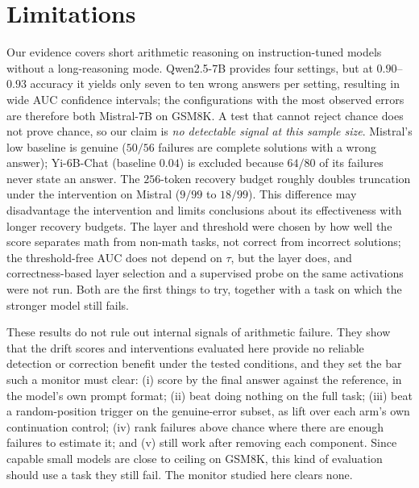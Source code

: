\documentclass{article}
\begin{document}
\section{Limitations}
\label{sec:limits}

Our evidence covers short arithmetic reasoning on instruction-tuned models without a long-reasoning mode. Qwen2.5-7B provides four settings, but at $0.90$--$0.93$ accuracy it yields only seven to ten wrong answers per setting, resulting in wide AUC confidence intervals; the configurations with the most observed errors are therefore both Mistral-7B on GSM8K. A test that cannot reject chance does not prove chance, so our claim is \emph{no detectable signal at this sample size}. Mistral's low baseline is genuine ($50/56$ failures are complete solutions with a wrong answer); Yi-6B-Chat (baseline $0.04$) is excluded because $64/80$ of its failures never state an answer. The $256$-token recovery budget roughly doubles truncation under the intervention on Mistral ($9/99$ to $18/99$). This difference may disadvantage the intervention and limits conclusions about its effectiveness with longer recovery budgets. The layer and threshold were chosen by how well the score separates math from non-math tasks, not correct from incorrect solutions; the threshold-free AUC does not depend on $\tau$, but the layer does, and correctness-based layer selection and a supervised probe on the same activations were not run. Both are the first things to try, together with a task on which the stronger model still fails.

These results do not rule out internal signals of arithmetic failure. They show that the drift scores and interventions evaluated here provide no reliable detection or correction benefit under the tested conditions, and they set the bar such a monitor must clear: (i) score by the final answer against the reference, in the model's own prompt format; (ii) beat doing nothing on the full task; (iii) beat a random-position trigger on the genuine-error subset, as lift over each arm's own continuation control; (iv) rank failures above chance where there are enough failures to estimate it; and (v) still work after removing each component. Since capable small models are close to ceiling on GSM8K, this kind of evaluation should use a task they still fail. The monitor studied here clears none.


\newpage




\newpage
\end{document}
